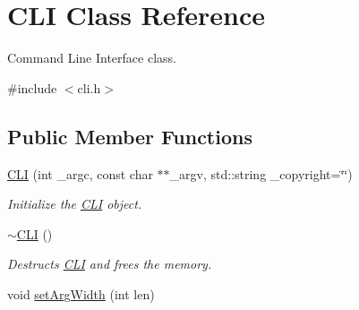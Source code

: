 \hypertarget{class_c_l_i}{}\section{C\+LI Class Reference}
\label{class_c_l_i}


Command Line Interface class.  




{\ttfamily \#include $<$cli.\+h$>$}

\subsection*{Public Member Functions}
\begin{DoxyCompactItemize}
\item 
\hyperlink{class_c_l_i_a5cd5ab6e74ca69247f2d3ee7a690b739}{C\+LI} (int \+\_\+argc, const char $\ast$$\ast$\+\_\+argv, std\+::string \+\_\+copyright=\char`\"{}\char`\"{})
\begin{DoxyCompactList}\small\item\em Initialize the \hyperlink{class_c_l_i}{C\+LI} object. \end{DoxyCompactList}\item 
\hyperlink{class_c_l_i_a9f59d57abf434f7161fcf3f61b725752}{$\sim$\+C\+LI} ()\hypertarget{class_c_l_i_a9f59d57abf434f7161fcf3f61b725752}{}\label{class_c_l_i_a9f59d57abf434f7161fcf3f61b725752}

\begin{DoxyCompactList}\small\item\em Destructs \hyperlink{class_c_l_i}{C\+LI} and frees the memory. \end{DoxyCompactList}\item 
void \hyperlink{class_c_l_i_a78cbe1af053c560dec375c270ac1bd44}{set\+Arg\+Width} (int len)\hypertarget{class_c_l_i_a78cbe1af053c560dec375c270ac1bd44}{}\label{class_c_l_i_a78cbe1af053c560dec375c270ac1bd44}


\end{DoxyCompactItemize}
